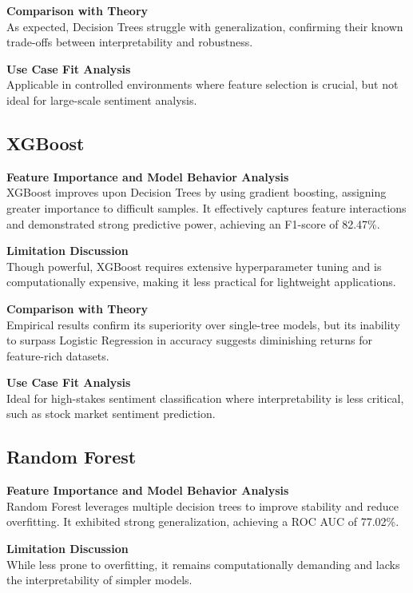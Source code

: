 \textbf{Comparison with Theory} \\
As expected, Decision Trees struggle with generalization, confirming their known trade-offs between interpretability and robustness.

\textbf{Use Case Fit Analysis} \\
Applicable in controlled environments where feature selection is crucial, but not ideal for large-scale sentiment analysis.

\subsection{XGBoost}

\textbf{Feature Importance and Model Behavior Analysis} \\
XGBoost improves upon Decision Trees by using gradient boosting, assigning greater importance to difficult samples. It effectively captures feature interactions and demonstrated strong predictive power, achieving an F1-score of 82.47\%.

\textbf{Limitation Discussion} \\
Though powerful, XGBoost requires extensive hyperparameter tuning and is computationally expensive, making it less practical for lightweight applications.

\textbf{Comparison with Theory} \\
Empirical results confirm its superiority over single-tree models, but its inability to surpass Logistic Regression in accuracy suggests diminishing returns for feature-rich datasets.

\textbf{Use Case Fit Analysis} \\
Ideal for high-stakes sentiment classification where interpretability is less critical, such as stock market sentiment prediction.

\subsection{Random Forest}

\textbf{Feature Importance and Model Behavior Analysis} \\
Random Forest leverages multiple decision trees to improve stability and reduce overfitting. It exhibited strong generalization, achieving a ROC AUC of 77.02\%.

\textbf{Limitation Discussion} \\
While less prone to overfitting, it remains computationally demanding and lacks the interpretability of simpler models.

